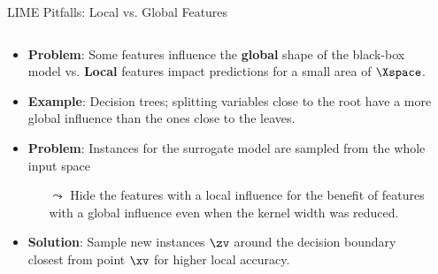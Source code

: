 \documentclass[11pt,compress,t,notes=noshow, aspectratio=169, xcolor=table]{beamer}
\begin{document}
\begin{vbframe}[c]{LIME Pitfalls: Local vs. Global Features }

\begin{columns}
	\begin{column}{0.78\textwidth}
\begin{itemize}
	\item \textbf{Problem}: Some features influence the \textbf{global} shape of the black-box model vs. \textbf{Local} features impact predictions for a small area of $\Xspace$. 
	\item \textbf{Example}: Decision trees; splitting variables close to the root have a more global influence than the ones close to the leaves.
	\item \textbf{Problem}: Instances for the surrogate model are sampled from the whole input space 
	\begin{itemize}
	    \item[$\leadsto$] Hide the features with a local influence for the benefit of features with a global influence even when the kernel width was reduced. 
	\end{itemize}
	\item \textbf{Solution}: Sample new instances $\zv$ around the decision boundary closest from point $\xv$ for higher local accuracy.
\end{itemize}
\end{column}
\begin{column}{0.2\textwidth}


\end{column}
\end{columns}
\end{vbframe}
\end{document}
